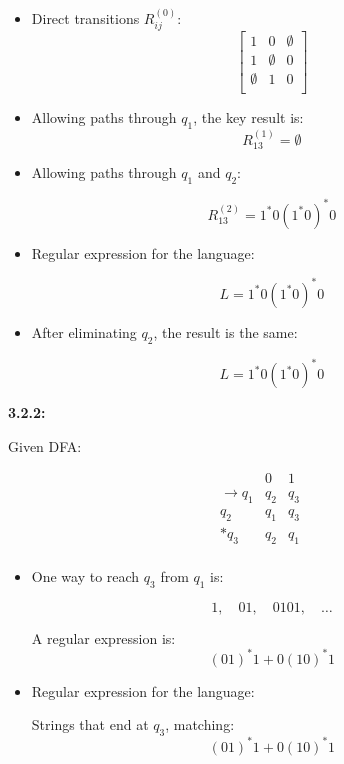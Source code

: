 \documentclass{article}
\theoremstyle{theorem}
\theoremstyle{definition}
\theoremstyle{remark}
\begin{document}
\begin{itemize}
    \item[(a)] Direct transitions \( R_{ij}^{(0)} \):
    \[\begin{bmatrix}
    1 & 0 & \emptyset \\
    1 & \emptyset & 0 \\
    \emptyset & 1 & 0 \\
    \end{bmatrix}\]

    \item[(b)] Allowing paths through \( q_1 \), the key result is:
    \[ R_{13}^{(1)} = \emptyset \]

    \item[(c)] Allowing paths through \( q_1 \) and \( q_2 \):

    \[R_{13}^{(2)} = 1^*0(1^*0)^*0\]

    \item[(d)] Regular expression for the language:

    \[L = 1^*0(1^*0)^*0\]

    \item[(e)] After eliminating \( q_2 \), the result is the same:

    \[L = 1^*0(1^*0)^*0\]
\end{itemize}



\textbf{3.2.2:}

Given DFA:

\[\begin{array}{c|cc}
 & 0 & 1 \\
\hline
\rightarrow q_1 & q_2 & q_3 \\
q_2 & q_1 & q_3 \\
\ast q_3 & q_2 & q_1 \\
\end{array}\]

\begin{itemize}
    \item[(c)] One way to reach \( q_3 \) from \( q_1 \) is:
    
    \[1, \quad 01, \quad 0101, \quad \dots\]

    A regular expression is:
    \[(01)^*1 + 0(10)^*1\]

    \item[(d)] Regular expression for the language:

    Strings that end at \( q_3 \), matching:
    \[(01)^*1 + 0(10)^*1\]

\end{itemize}
\end{document}
